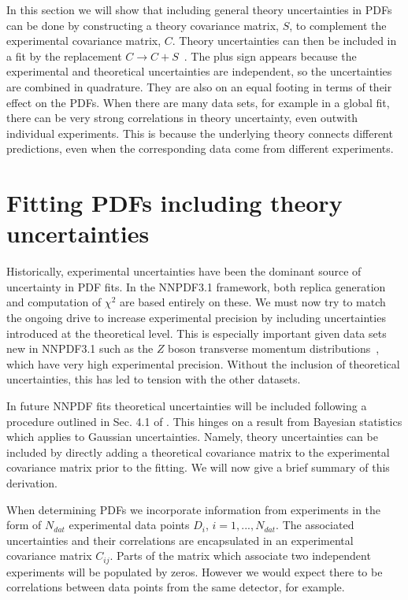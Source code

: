 In this section we will show that including general theory uncertainties in PDFs can be done by constructing a theory covariance matrix, $S$, to complement the experimental covariance matrix, $C$. Theory uncertainties can then be included in a fit by the replacement $C \to C + S$~\cite{Ball:2018odr}. The plus sign appears because the experimental and theoretical uncertainties are independent, so the uncertainties are combined in quadrature. They are also on an equal footing in terms of their effect on the PDFs. When there are many data sets, for example in a global fit, there can be very strong correlations in theory uncertainty, even outwith individual experiments. This is because the underlying theory connects different predictions, even when the corresponding data come from different experiments. 

\section{Fitting PDFs including theory uncertainties}
Historically, experimental uncertainties have been the dominant source of uncertainty in PDF fits. 
In the NNPDF3.1 framework, both replica generation and computation of $\chi^2$ 
are based entirely on these. We must now try to match the ongoing drive to 
increase experimental precision by including uncertainties introduced at the theoretical level. This is
especially important given data sets new in NNPDF3.1 such as the $Z$ boson transverse momentum
distributions~\cite{Aad:2014xaa,Khachatryan:2015oaa,Aad:2015auj}, which have very high experimental precision. Without
the inclusion of theoretical uncertainties, this has led to tension with the other datasets.

In future NNPDF fits theoretical uncertainties will be included following a procedure outlined in Sec. 4.1 of \cite{Ball:2018odr}. This hinges on a result from Bayesian statistics
which applies to Gaussian uncertainties. Namely, theory uncertainties can be included by directly 
adding a theoretical
covariance matrix to the experimental covariance matrix prior to the fitting. We will now give a brief summary of this derivation.

When determining PDFs we incorporate information from experiments in the form of $N_{dat}$ experimental data points $D_i$, $i=1,...,N_{dat}$. The associated uncertainties and their correlations are encapsulated in an experimental covariance matrix $C_{ij}$. Parts of the matrix which associate two independent experiments will be populated by zeros. However we would expect there to be correlations between data points from the same detector, for example.

